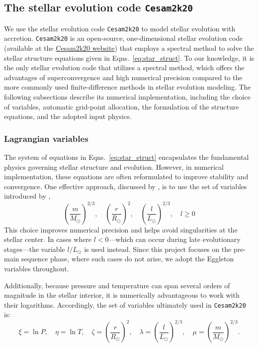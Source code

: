 \documentclass[12pt,a4paper]{article}
\begin{document}
\subsection{The stellar evolution code \texttt{Cesam2k20}}
\label{sec:cesam2k20}

We use the stellar evolution code \texttt{Cesam2k20} \parencite{MarquesEtAl2013,MorelLebreton2008,Morel1997} to model stellar evolution with accretion. \texttt{Cesam2k20} is an open-source, one-dimensional stellar evolution code (available at the \href{https://www.ias.u-psud.fr/cesam2k20/home.html}{Cesam2k20 website}) that employs a spectral method to solve the stellar structure equations given in Eqns.~\eqref{eq:star_struct}. To our knowledge, it is the only stellar evolution code that utilizes a spectral method, which offers the advantages of superconvergence and high numerical precision compared to the more commonly used finite-difference methods in stellar evolution modeling. The following subsections describe its numerical implementation, including the choice of variables, automatic grid-point allocation, the formulation of the structure equations, and the adopted input physics.

\subsubsection{Lagrangian variables}
\label{sec:cesam2k20_variables}

The system of equations in Eqns.~\eqref{eq:star_struct} encapsulates the fundamental physics governing stellar structure and evolution. However, in numerical implementation, these equations are often reformulated to improve stability and convergence. One effective approach, discussed by \textcite{Morel1997}, is to use the set of variables introduced by \textcite{Eggleton1971},
\begin{equation*}
\left(\frac{m}{M_\odot}\right)^{2/3},\quad \left(\frac{r}{R_\odot}\right)^2,\quad \left(\frac{l}{L_\odot}\right)^{2/3}, \quad l \geq 0
\end{equation*}
This choice improves numerical precision and helps avoid singularities at the stellar center. In cases where $l < 0$—which can occur during late evolutionary stages—the variable $l/L_\odot$ is used instead. Since this project focuses on the pre-main sequence phase, where such cases do not arise, we adopt the Eggleton variables throughout.

Additionally, because pressure and temperature can span several orders of magnitude in the stellar interior, it is numerically advantageous to work with their logarithms. Accordingly, the set of variables ultimately used in \texttt{Cesam2k20} is:
\begin{equation}
\xi = \ln P,\quad \eta = \ln T,\quad \zeta = \left(\frac{r}{R_\odot}\right)^2,\quad \lambda = \left(\frac{l}{L_\odot}\right)^{2/3},\quad \mu = \left(\frac{m}{M_\odot}\right)^{2/3}.
\end{equation}
\end{document}

